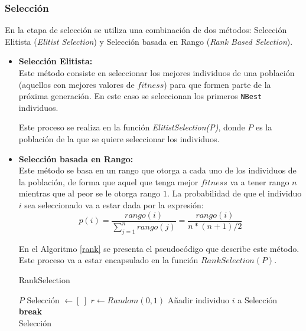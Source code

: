 \documentclass[a4paper,10pt,twocolumn]{article}
\begin{document}
\subsubsection{Selección}
En la etapa de selección se utiliza una combinación de dos métodos: Selección Elitista (\textit{Elitist Selection}) y Selección basada en Rango (\textit{Rank Based Selection}).
\begin{itemize}
	\item  \textbf{Selección Elitista:}\\
	Este método consiste en seleccionar los mejores individuos de una población (aquellos con mejores valores de $fitness$) para que formen parte de la próxima generación. En este caso se seleccionan los primeros \texttt{NBest} individuos.
	
	 Este proceso se realiza en la función \textit{ElitistSelection(P)}, donde $P$ es la población de la que se quiere seleccionar los individuos. 
	
	
	\item  \textbf{Selección basada en Rango:}\\
	Este método se basa en un rango que otorga a cada uno de los individuos de la población, de forma que aquel que tenga mejor $fitness$ va a tener rango $n$ mientras que al peor se le otorga rango $1$. La probabilidad de que el individuo $i$ sea seleccionado va a estar dada por la expresión:
	$$ p(i) = \frac{rango(i)}{\sum_{j = 1}^{n}rango(j) } = \frac{rango(i)}{n*(n+1)/2} $$
	
	En el Algoritmo \ref{rank} se presenta el pseudocódigo que describe este método. Este proceso va a estar encapsulado en la función $RankSelection(P)$.
	
	\algrenewcommand{}
	\begin{algorithm}
		\caption{RankSelection}\label{rank}
		\begin{algorithmic}[1]
			\Require $P$
			\State Selección $\gets [\  ]$
				\State $r \gets Random(0,1)$
						\State Añadir individuo $i$ a Selección
						\State \textbf{break}
					\EndIf
				\EndFor
			\EndFor \\
			\Return Selección
		\end{algorithmic}
	\end{algorithm}
	  
	
\end{itemize}
\end{document}
